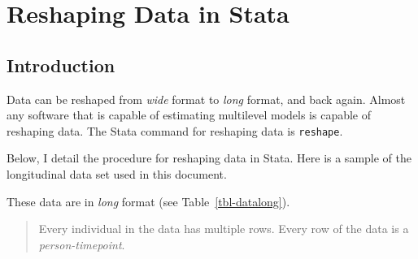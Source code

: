 \documentclass[
  letterpaper,
  DIV=11,
  numbers=noendperiod]{scrreprt}
\begin{document}
\chapter{Reshaping Data in Stata}\label{sec-reshape}

\section{Introduction}\label{introduction-2}

Data can be reshaped from \emph{wide} format to \emph{long} format, and
back again. Almost any software that is capable of estimating multilevel
models is capable of reshaping data. The Stata command for reshaping
data is \texttt{reshape}.

Below, I detail the procedure for reshaping data in Stata. Here is a
sample of the longitudinal data set used in this document.

These data are in \emph{long} format (see Table~\ref{tbl-datalong}).

\begin{quote}
Every individual in the data has multiple rows. Every row of the data is
a \emph{person-timepoint}.
\end{quote}
\end{document}

